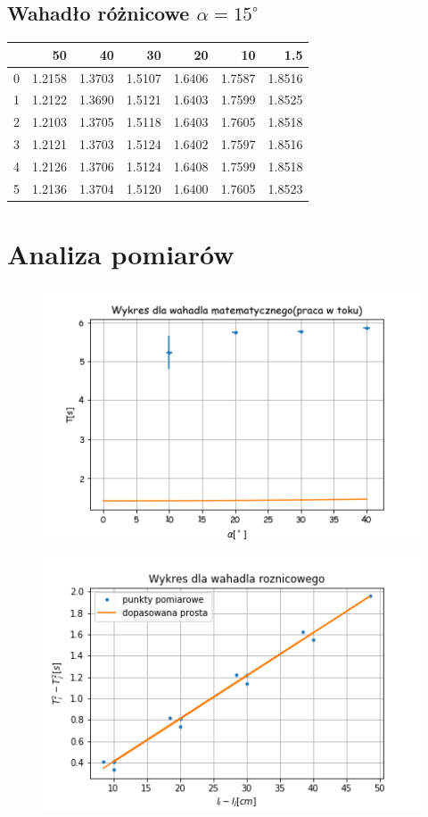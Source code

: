 \documentclass[a4paper,10pt]{article}
\begin{document}
\subsection{Wahadło różnicowe $\alpha = 15^\circ$}
\begin{tabular}{lrrrrrr}
\toprule
{} &      50 &      40 &      30 &      20 &      10 &     1.5 \\
\midrule
0 &  1.2158 &  1.3703 &  1.5107 &  1.6406 &  1.7587 &  1.8516 \\
1 &  1.2122 &  1.3690 &  1.5121 &  1.6403 &  1.7599 &  1.8525 \\
2 &  1.2103 &  1.3705 &  1.5118 &  1.6403 &  1.7605 &  1.8518 \\
3 &  1.2121 &  1.3703 &  1.5124 &  1.6402 &  1.7597 &  1.8516 \\
4 &  1.2126 &  1.3706 &  1.5124 &  1.6408 &  1.7599 &  1.8518 \\
5 &  1.2136 &  1.3704 &  1.5120 &  1.6400 &  1.7605 &  1.8523 \\
\bottomrule
\end{tabular}

\section{Analiza pomiarów}
\begin{figure}[H]
    \includegraphics{./Wykres_matematyczne.png}
    \caption{}
    \label{}
\end{figure}

\begin{figure}[H]
    \includegraphics{./Wykres_roznicowe.png}
    \caption{}
    \label{}
\end{figure}
\end{document}
